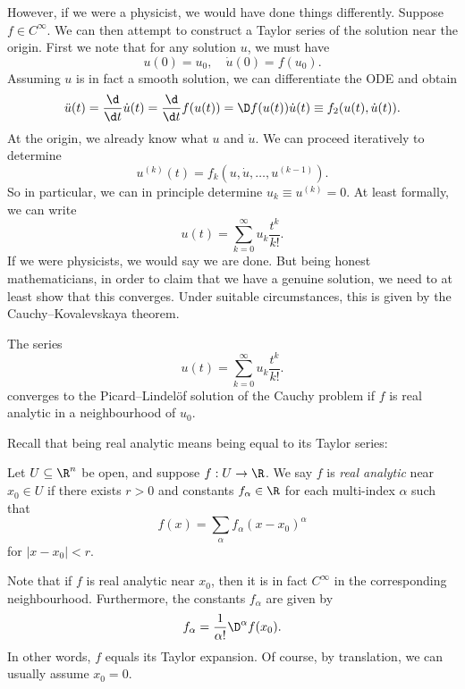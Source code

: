\documentclass[a4paper]{article}
\begin{document}
However, if we were a physicist, we would have done things differently. Suppose $f \in C^\infty$. We can then attempt to construct a Taylor series of the solution near the origin. First we note that for any solution $u$, we must have
\[
   u(0) = u_0,\quad \dot{u}(0) = f(u_0).
\]
Assuming $u$ is in fact a smooth solution, we can differentiate the ODE and obtain
\[
  \ddot{u}(t) = \frac{\d}{\d t} \dot{u}(t) = \frac{\d}{\d t} f(u(t)) = \D f(u(t)) \dot{u}(t) \equiv f_2(u(t), \dot{u}(t)).
\]
At the origin, we already know what $u$ and $\dot{u}$. We can proceed iteratively to determine
\[
  u^{(k)}(t) = f_k (u, \dot{u}, \ldots, u^{(k - 1)}).
\]
So in particular, we can in principle determine $u_k \equiv u^{(k)} = 0$. At least formally, we can write
\[
  u(t) = \sum_{k = 0}^\infty u_k \frac{t^k}{k!}.
\]
If we were physicists, we would say we are done. But being honest mathematicians, in order to claim that we have a genuine solution, we need to at least show that this converges. Under suitable circumstances, this is given by the Cauchy--Kovalevskaya theorem.

\begin{thm}
  The series
  \[
    u(t) = \sum_{k = 0}^\infty u_k \frac{t^k}{k!}.
  \]
  converges to the Picard--Lindel\"of solution of the Cauchy problem if $f$ is real analytic in a neighbourhood of $u_0$.
\end{thm}

Recall that being real analytic means being equal to its Taylor series:
\begin{defi}
  Let $U \subseteq \R^n$ be open, and suppose $f: U \to \R$. We say $f$ is \emph{real analytic} near $x_0 \in U$ if there exists $r > 0$ and constants $f_\alpha \in \R$ for each multi-index $\alpha$ such that
  \[
    f(x) = \sum_\alpha f_\alpha (x - x_0)^\alpha
  \]
  for $|x - x_0| < r$.
\end{defi}

Note that if $f$ is real analytic near $x_0$, then it is in fact $C^\infty$ in the corresponding neighbourhood. Furthermore, the constants $f_\alpha$ are given by
\[
  f_\alpha = \frac{1}{\alpha!} \D^\alpha f(x_0).
\]
In other words, $f$ equals its Taylor expansion. Of course, by translation, we can usually assume $x_0 = 0$.
\end{document}
